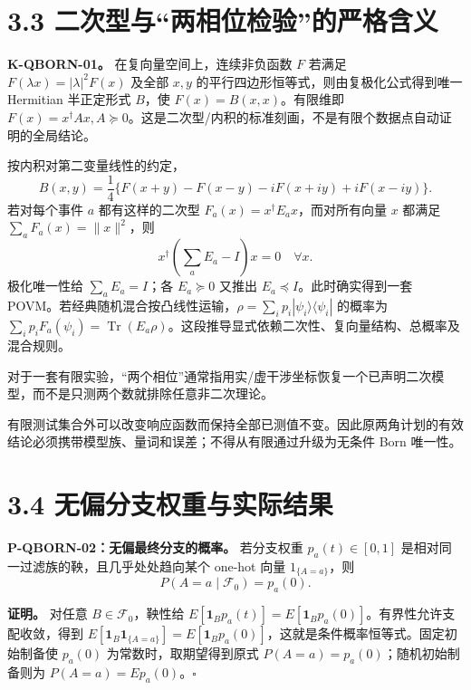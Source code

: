 \documentclass[
  11pt,
  oneside]{book}
\begin{document}
\hypertarget{ux4e8cux6b21ux578bux4e0eux4e24ux76f8ux4f4dux68c0ux9a8cux7684ux4e25ux683cux542bux4e49}{%
\section{3.3
二次型与``两相位检验''的严格含义}\label{ux4e8cux6b21ux578bux4e0eux4e24ux76f8ux4f4dux68c0ux9a8cux7684ux4e25ux683cux542bux4e49}}

\textbf{K-QBORN-01。} 在复向量空间上，连续非负函数 \(F\) 若满足
\(F(\lambda x)=|\lambda|^2F(x)\) 及全部 \(x,y\)
的平行四边形恒等式，则由复极化公式得到唯一 Hermitian 半正定形式
\(B\)，使 \(F(x)=B(x,x)\)。有限维即
\(F(x)=x^\dagger Ax,A\succeq0\)。这是二次型/内积的标准刻画，不是有限个数据点自动证明的全局结论。

按内积对第二变量线性的约定， \[
B(x,y)=\frac14\{F(x+y)-F(x-y)
-iF(x+iy)+iF(x-iy)\}.
\] 若对每个事件 \(a\) 都有这样的二次型
\(F_a(x)=x^\dagger E_ax\)，而对所有向量 \(x\) 都满足
\(\sum_aF_a(x)=\|x\|^2\)，则 \[
x^\dagger\left(\sum_aE_a-I\right)x=0\quad\forall x.
\] 极化唯一性给 \(\sum_aE_a=I\)；各 \(E_a\succeq0\) 又推出
\(E_a\preceq I\)。此时确实得到一套
POVM。若经典随机混合按凸线性运输，\(\rho=\sum_ip_i|\psi_i\rangle\langle\psi_i|\)
的概率为
\(\sum_ip_iF_a(\psi_i)=\operatorname{Tr}(E_a\rho)\)。这段推导显式依赖二次性、复向量结构、总概率及混合规则。

对于一套有限实验，``两个相位''通常指用实/虚干涉坐标恢复一个已声明二次模型，而不是只测两个数就排除任意非二次理论。

有限测试集合外可以改变响应函数而保持全部已测值不变。因此原两角计划的有效结论必须携带模型族、量词和误差；不得从有限通过升级为无条件
Born 唯一性。

\hypertarget{ux65e0ux504fux5206ux652fux6743ux91cdux4e0eux5b9eux9645ux7ed3ux679c}{%
\section{3.4
无偏分支权重与实际结果}\label{ux65e0ux504fux5206ux652fux6743ux91cdux4e0eux5b9eux9645ux7ed3ux679c}}

\protect\hypertarget{p-qborn-02}{}{}

\textbf{P-QBORN-02：无偏最终分支的概率。} 若分支权重 \(p_a(t)\in[0,1]\)
是相对同一过滤族的鞅，且几乎处处趋向某个 one-hot 向量
\(1_{\{A=a\}}\)，则 \[
P(A=a\mid\mathcal F_0)=p_a(0).
\]

\textbf{证明。} 对任意 \(B\in\mathcal F_0\)，鞅性给
\(E[\mathbf1_Bp_a(t)]=E[\mathbf1_Bp_a(0)]\)。有界性允许支配收敛，得到
\(E[\mathbf1_B\mathbf1_{\{A=a\}}]=E[\mathbf1_Bp_a(0)]\)，这就是条件概率恒等式。固定初始制备使
\(p_a(0)\) 为常数时，取期望得到原式 \(P(A=a)=p_a(0)\)；随机初始制备则为
\(P(A=a)=Ep_a(0)\)。\(\square\)
\end{document}
